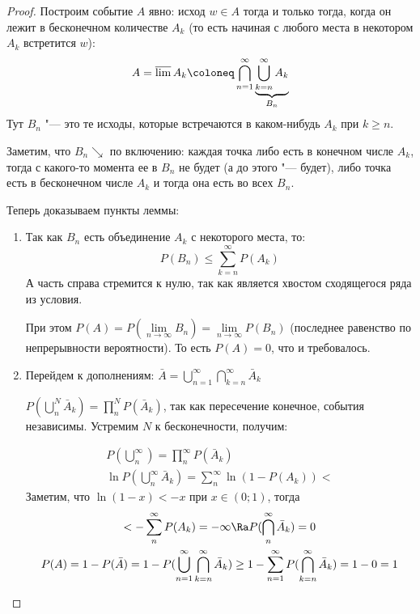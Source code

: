 \begin{proof}
	Построим событие $A$ явно: исход $w \in A$ тогда и только тогда,
	когда он лежит в бесконечном количестве $A_k$ (то есть начиная с любого места в некотором $A_k$ встретится $w$):
    \[ A = \varlimsup A_k \coloneq \bigcap\limits_{n=1}^{\infty} \underbrace{\bigcup\limits_{k=n}^{\infty} A_k}_{B_n} \]
    Тут $B_n$ "--- это те исходы, которые встречаются в каком-нибудь $A_{k}$ при $k \ge n$.

    Заметим, что $B_n \searrow$ по включению: каждая точка либо есть в конечном числе $A_k$, тогда с какого-то момента ее в $B_n$ не будет (а до этого "--- будет), либо точка есть в бесконечном числе $A_k$ и тогда она есть во всех $B_n$.

    Теперь доказываем пункты леммы:
    \begin{enumerate}
	\item
    	Так как $B_n$ есть объединение $A_k$ с некоторого места, то:
    	\[ P(B_n) \leq \sum\limits_{k=n}^{\infty} P(A_k) \]
    	А часть справа стремится к нулю, так как является хвостом сходящегося ряда из условия.

		При этом $P(A) = P\left(\lim\limits_{n \to \infty} B_n\right) = \lim\limits_{n \to \infty} P(B_n)$ (последнее равенство по непрерывности вероятности).
		То есть $P(A) = 0$, что и требовалось. 

    \item
    Перейдем к дополнениям: $\bar A = \bigcup\limits_{n=1}^{\infty} \bigcap\limits_{k=n}^{\infty} \bar A_k$

    $P(\bigcup\limits_n^N \bar A_k) = \prod\limits_n^N P(\bar A_k)$, так как пересечение конечное, события независимы.
    Устремим $N$ к бесконечности, получим:

    \begin{gather*} 
    P(\bigcup\limits_n^{\infty}) = \prod\limits_n^{\infty} P(\bar A_k)\\
    \ln P(\bigcup\limits_n^{\infty} \bar A_k) = \sum\limits_n^{\infty} \ln(1 - P(A_k)) < 
    \end{gather*}     
    Заметим, что $\ln(1 - x) < -x$ при $x \in (0; 1)$, тогда
    \begin{gather*} 
     < -\sum\limits_n^{\infty} P(A_k) = -\infty \Ra P(\bigcap\limits_n^{\infty} \bar A_k) = 0 \\
    P(A) = 1 - P(\bar A) = 1 - P(\bigcup\limits_{n=1}^{\infty} \bigcap\limits_{k=n}^{\infty} \bar A_k) \geq 1 - \sum\limits_{n=1}^{\infty} P(\bigcap\limits_{k=n}^{\infty} \bar A_k) = 1 - 0 = 1
    \end{gather*} 
                                                                                     
    \end{enumerate}
\end{proof}

